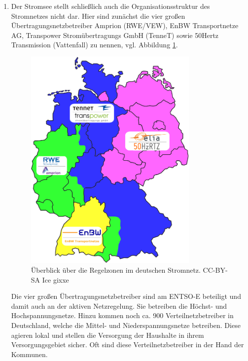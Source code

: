 \documentclass[12pt,BCOR=8.5mm]{scrartcl}
\newcommand*\imgwidth{0.8\textwidth}
\begin{document}
\begin{enumerate}
  \item Der Stromsee stellt schließlich auch die Organisationsstruktur
    des Stromnetzes nicht dar. Hier sind zunächst die vier großen
    Übertragungsnetzbetreiber Amprion (RWE/VEW), EnBW Transportnetze AG,
    Transpower Stromübertragungs GmbH (TenneT) sowie 50Hertz
    Transmission (Vattenfall) zu nennen, vgl. Abbildung
    \ref{fig:regelzonen}.  \begin{figure}[htbp] \begin{center}
      \includegraphics[width=\imgwidth]{figures/Regelzonen_deutscher_Netzbetreiber_neu.png}
      \caption{Überblick über die Regelzonen im deutschen Stromnetz.
      CC-BY-SA Ice gixxe} \label{fig:regelzonen} \end{center}
    \end{figure}
    Die vier großen Übertragungsnetzbetreiber sind am ENTSO-E beteiligt
    und damit auch an der aktiven Netzregelung. Sie betreiben die
    Höchst- und Hochspannungsnetze. Hinzu kommen noch ca. 900
    Verteilnetzbetreiber in Deutschland, welche die Mittel- und
    Niederspannungsnetze betreiben. Diese agieren lokal und stellen die
    Versorgung der Haushalte in ihrem Versorgungsgebiet sicher. Oft sind
    diese Verteilnetzbetreiber in der Hand der Kommunen.


\end{enumerate}
\end{document}
